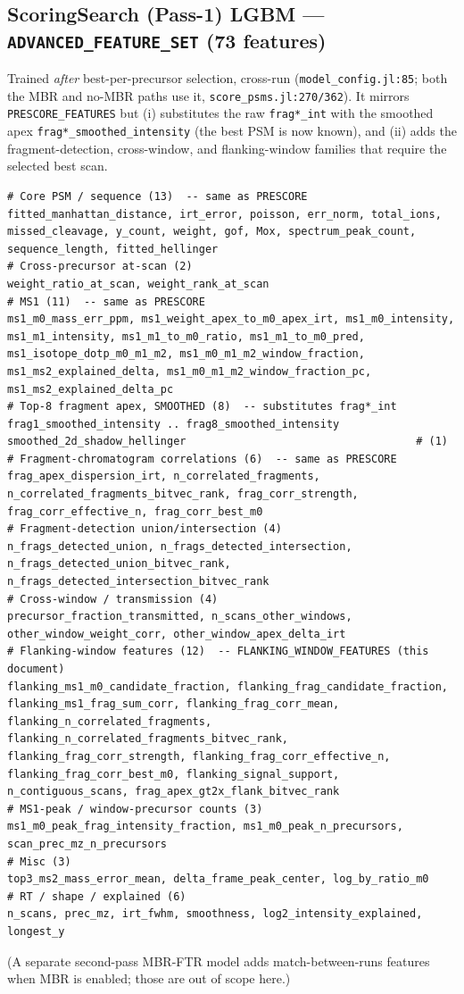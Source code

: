 \documentclass[11pt]{article}
\newcommand{\code}[1]{\texttt{#1}}
\begin{document}
\subsection{ScoringSearch (Pass-1) LGBM --- \code{ADVANCED\_FEATURE\_SET} (73 features)}
Trained \emph{after} best-per-precursor selection, cross-run (\code{model\_config.jl:85}; both
the MBR and no-MBR paths use it, \code{score\_psms.jl:270/362}). It mirrors
\code{PRESCORE\_FEATURES} but (i) substitutes the raw \code{frag*\_int} with the smoothed apex
\code{frag*\_smoothed\_intensity} (the best PSM is now known), and (ii) adds the
fragment-detection, cross-window, and flanking-window families that require the selected best
scan.
\begin{lstlisting}
# Core PSM / sequence (13)  -- same as PRESCORE
fitted_manhattan_distance, irt_error, poisson, err_norm, total_ions,
missed_cleavage, y_count, weight, gof, Mox, spectrum_peak_count,
sequence_length, fitted_hellinger
# Cross-precursor at-scan (2)
weight_ratio_at_scan, weight_rank_at_scan
# MS1 (11)  -- same as PRESCORE
ms1_m0_mass_err_ppm, ms1_weight_apex_to_m0_apex_irt, ms1_m0_intensity,
ms1_m1_intensity, ms1_m1_to_m0_ratio, ms1_m1_to_m0_pred,
ms1_isotope_dotp_m0_m1_m2, ms1_m0_m1_m2_window_fraction,
ms1_ms2_explained_delta, ms1_m0_m1_m2_window_fraction_pc,
ms1_ms2_explained_delta_pc
# Top-8 fragment apex, SMOOTHED (8)  -- substitutes frag*_int
frag1_smoothed_intensity .. frag8_smoothed_intensity
smoothed_2d_shadow_hellinger                                    # (1)
# Fragment-chromatogram correlations (6)  -- same as PRESCORE
frag_apex_dispersion_irt, n_correlated_fragments,
n_correlated_fragments_bitvec_rank, frag_corr_strength,
frag_corr_effective_n, frag_corr_best_m0
# Fragment-detection union/intersection (4)
n_frags_detected_union, n_frags_detected_intersection,
n_frags_detected_union_bitvec_rank, n_frags_detected_intersection_bitvec_rank
# Cross-window / transmission (4)
precursor_fraction_transmitted, n_scans_other_windows,
other_window_weight_corr, other_window_apex_delta_irt
# Flanking-window features (12)  -- FLANKING_WINDOW_FEATURES (this document)
flanking_ms1_m0_candidate_fraction, flanking_frag_candidate_fraction,
flanking_ms1_frag_sum_corr, flanking_frag_corr_mean,
flanking_n_correlated_fragments, flanking_n_correlated_fragments_bitvec_rank,
flanking_frag_corr_strength, flanking_frag_corr_effective_n,
flanking_frag_corr_best_m0, flanking_signal_support,
n_contiguous_scans, frag_apex_gt2x_flank_bitvec_rank
# MS1-peak / window-precursor counts (3)
ms1_m0_peak_frag_intensity_fraction, ms1_m0_peak_n_precursors,
scan_prec_mz_n_precursors
# Misc (3)
top3_ms2_mass_error_mean, delta_frame_peak_center, log_by_ratio_m0
# RT / shape / explained (6)
n_scans, prec_mz, irt_fwhm, smoothness, log2_intensity_explained, longest_y
\end{lstlisting}
\noindent (A separate second-pass MBR-FTR model adds match-between-runs features when MBR is
enabled; those are out of scope here.)
\end{document}
